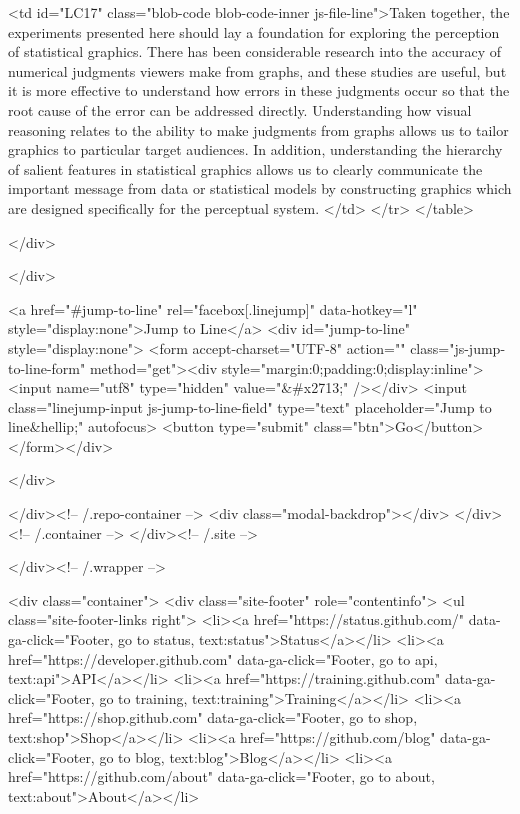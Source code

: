         <td id="LC17" class="blob-code blob-code-inner js-file-line">Taken together, the experiments presented here should lay a foundation for exploring the perception of statistical graphics. There has been considerable research into the accuracy of numerical judgments viewers make from graphs, and these studies are useful, but it is more effective to understand how errors in these judgments occur so that the root cause of the error can be addressed directly. Understanding how visual reasoning relates to the ability to make judgments from graphs allows us to tailor graphics to particular target audiences. In addition, understanding the hierarchy of salient features in statistical graphics allows us to clearly communicate the important message from data or statistical models by constructing graphics which are designed specifically for the perceptual system. </td>
      </tr>
</table>

  </div>

</div>

<a href="#jump-to-line" rel="facebox[.linejump]" data-hotkey="l" style="display:none">Jump to Line</a>
<div id="jump-to-line" style="display:none">
  <form accept-charset="UTF-8" action="" class="js-jump-to-line-form" method="get"><div style="margin:0;padding:0;display:inline"><input name="utf8" type="hidden" value="&#x2713;" /></div>
    <input class="linejump-input js-jump-to-line-field" type="text" placeholder="Jump to line&hellip;" autofocus>
    <button type="submit" class="btn">Go</button>
</form></div>

        </div>

      </div><!-- /.repo-container -->
      <div class="modal-backdrop"></div>
    </div><!-- /.container -->
  </div><!-- /.site -->


    </div><!-- /.wrapper -->

      <div class="container">
  <div class="site-footer" role="contentinfo">
    <ul class="site-footer-links right">
        <li><a href="https://status.github.com/" data-ga-click="Footer, go to status, text:status">Status</a></li>
      <li><a href="https://developer.github.com" data-ga-click="Footer, go to api, text:api">API</a></li>
      <li><a href="https://training.github.com" data-ga-click="Footer, go to training, text:training">Training</a></li>
      <li><a href="https://shop.github.com" data-ga-click="Footer, go to shop, text:shop">Shop</a></li>
        <li><a href="https://github.com/blog" data-ga-click="Footer, go to blog, text:blog">Blog</a></li>
        <li><a href="https://github.com/about" data-ga-click="Footer, go to about, text:about">About</a></li>

